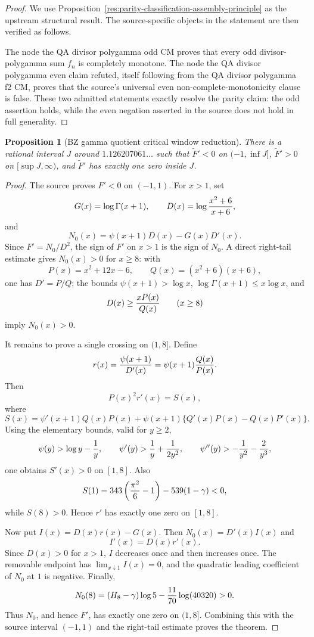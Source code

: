 \documentclass[11pt]{article}
\numberwithin{equation}{section}
\newtheorem{proposition}[theorem]{Proposition}
\theoremstyle{definition}
\theoremstyle{remark}
\newcommand{\1}{\mathbf 1}
\begin{document}
\begin{proof}
We use Proposition~\ref{res:parity-classification-assembly-principle} as the upstream structural result. The source-specific objects in the statement are then verified as follows.

The node the QA divisor polygamma odd CM proves that every odd divisor-polygamma sum \(f_n\) is completely monotone. The node the QA divisor polygamma even claim refuted, itself following from the QA divisor polygamma f2 CM, proves that the source's universal even non-complete-monotonicity clause is false. These two admitted statements exactly resolve the parity claim: the odd assertion holds, while the even negation asserted in the source does not hold in full generality.
\end{proof}

\begin{proposition}[BZ gamma quotient critical window reduction]
\label{res:bz-gamma-quotient-critical-window-reduction}
There is a rational interval \(J\) around \(1.126207061\ldots\) such that \(\widetilde F'<0\) on \((-1,\inf J]\), \(\widetilde F'>0\) on \([\sup J,\infty)\), and \(\widetilde F'\) has exactly one zero inside \(J\).
\end{proposition}

\begin{proof}
The source proves \(F'<0\) on \((-1,1)\).  For \(x>1\), set
\[
 G(x)=\log\Gamma(x+1),\qquad
 D(x)=\log{x^2+6\over x+6},
\]
and
\[
 N_0(x)=\psi(x+1)D(x)-G(x)D'(x).
\]
Since \(F'=N_0/D^2\), the sign of \(F'\) on \(x>1\) is the sign of \(N_0\).
A direct right-tail estimate gives \(N_0(x)>0\) for \(x\ge8\): with
\[
 P(x)=x^2+12x-6,\qquad Q(x)=(x^2+6)(x+6),
\]
one has \(D'=P/Q\); the bounds \(\psi(x+1)>\log x\),
\(\log\Gamma(x+1)\le x\log x\), and
\[
 D(x)\ge {xP(x)\over Q(x)}
 \qquad(x\ge8)
\]
imply \(N_0(x)>0\).

It remains to prove a single crossing on \((1,8]\).  Define
\[
 r(x)={\psi(x+1)\over D'(x)}
      =\psi(x+1){Q(x)\over P(x)}.
\]
Then
\[
 P(x)^2r'(x)=S(x),
\]
where
\[
 S(x)=\psi'(x+1)Q(x)P(x)
 +\psi(x+1)\{Q'(x)P(x)-Q(x)P'(x)\}.
\]
Using the elementary bounds, valid for \(y\ge2\),
\[
 \psi(y)>\log y-{1\over y},\qquad
 \psi'(y)>{1\over y}+{1\over2y^2},\qquad
 \psi''(y)>-{1\over y^2}-{2\over y^3},
\]
one obtains \(S'(x)>0\) on \([1,8]\).  Also
\[
 S(1)=343\left({\pi^2\over6}-1\right)-539(1-\gamma)<0,
\]
while \(S(8)>0\).  Hence \(r'\) has exactly one zero on \([1,8]\).

Now put \(I(x)=D(x)r(x)-G(x)\).  Then \(N_0(x)=D'(x)I(x)\) and
\[
 I'(x)=D(x)r'(x).
\]
Since \(D(x)>0\) for \(x>1\), \(I\) decreases once and then increases once.
The removable endpoint has \(\lim_{x\downarrow1}I(x)=0\), and the quadratic
leading coefficient of \(N_0\) at \(1\) is negative.  Finally,
\[
 N_0(8)=(H_8-\gamma)\log5-{11\over70}\log(40320)>0.
\]
Thus \(N_0\), and hence \(F'\), has exactly one zero on \((1,8]\).  Combining
this with the source interval \((-1,1)\) and the right-tail estimate proves
the theorem.
\end{proof}
\end{document}
